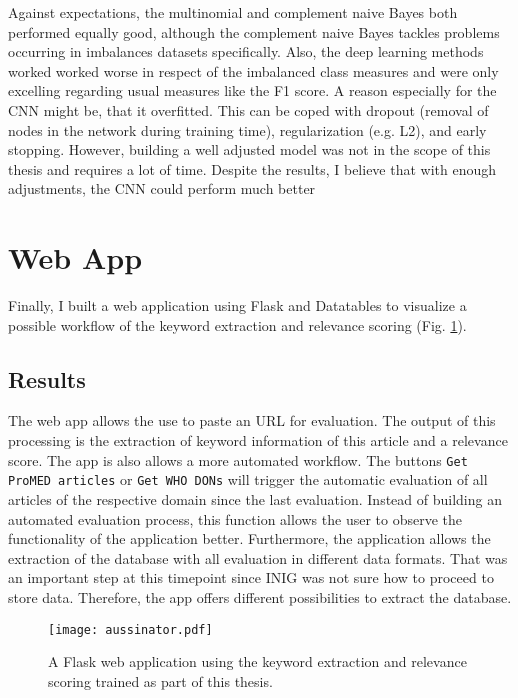   Against expectations, the multinomial and complement naive Bayes both performed equally good, although the complement naive Bayes tackles problems occurring in imbalances datasets specifically. Also, the deep learning methods worked worked worse in respect of the imbalanced class measures and were only excelling regarding usual measures like the F1 score. A reason especially for the CNN might be, that it overfitted. This can be coped with dropout (removal of nodes in the network during training time), regularization (e.g. L2), and early stopping. However, building a well adjusted model was not in the scope of this thesis and requires a lot of time. Despite the results, I believe that with enough adjustments, the CNN could perform much better

\section{Web App}
  Finally, I built a web application using Flask and Datatables to visualize a possible workflow of the keyword extraction and relevance scoring (Fig. \ref{fig:t-aussinator}).

\subsection{Results}
  The web app allows the use to paste an URL for evaluation. The output of this processing is the extraction of keyword information of this article and a relevance score. The app is also allows a more automated workflow. The buttons \texttt{Get ProMED articles} or \texttt{Get WHO DONs} will trigger the automatic evaluation of all articles of the respective domain since the last evaluation. Instead of building an automated evaluation process, this function allows the user to observe the functionality of the application better. Furthermore, the application allows the extraction of the database with all evaluation in different data formats. That was an important step at this timepoint since INIG was not sure how to proceed to store data. Therefore, the app offers different possibilities to extract the database.

\begin{figure}
  \centering
  \texttt{[image: aussinator.pdf]}
  \caption{A Flask web application using the keyword extraction and relevance scoring trained as part of this thesis.}
\label{fig:t-aussinator}
\end{figure}

